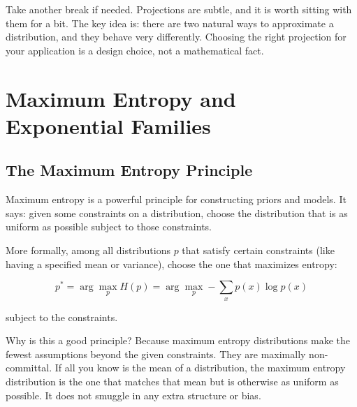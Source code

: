 \vspace{2em}

Take another break if needed. Projections are subtle, and it is worth sitting with them for a bit. The key idea is: there are two natural ways to approximate a distribution, and they behave very differently. Choosing the right projection for your application is a design choice, not a mathematical fact.

\vspace{2em}

\section{Maximum Entropy and Exponential Families}

\subsection{The Maximum Entropy Principle}

Maximum entropy is a powerful principle for constructing priors and models. It says: given some constraints on a distribution, choose the distribution that is as uniform as possible subject to those constraints.

More formally, among all distributions $p$ that satisfy certain constraints (like having a specified mean or variance), choose the one that maximizes entropy:

\begin{equation}
p^* = \arg\max_{p} H(p) = \arg\max_p -\sum_x p(x) \log p(x)
\end{equation}

subject to the constraints.

\vspace{1em}

Why is this a good principle? Because maximum entropy distributions make the fewest assumptions beyond the given constraints. They are maximally non-committal. If all you know is the mean of a distribution, the maximum entropy distribution is the one that matches that mean but is otherwise as uniform as possible. It does not smuggle in any extra structure or bias.

\vspace{1.5em}

